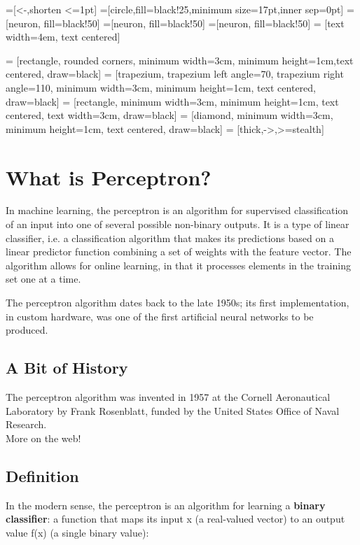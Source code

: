 \documentclass[12pt, right open]{memoir}
\begin{document}

=[<-,shorten <=1pt]
=[circle,fill=black!25,minimum size=17pt,inner sep=0pt]
=[neuron, fill=black!50]
=[neuron, fill=black!50]
=[neuron, fill=black!50]
 = [text width=4em, text centered]

 = [rectangle, rounded corners, minimum width=3cm, minimum height=1cm,text centered, draw=black]
 = [trapezium, trapezium left angle=70, trapezium right angle=110, minimum width=3cm, minimum height=1cm, text centered, draw=black]
 = [rectangle, minimum width=3cm, minimum height=1cm, text centered, text width=3cm, draw=black]
 = [diamond, minimum width=3cm, minimum height=1cm, text centered, draw=black]
 = [thick,->,>=stealth]

\chapter{What is Perceptron?}
In machine learning, the perceptron is an algorithm for supervised classification of an input into one of several possible non-binary outputs. It is a type of linear classifier, i.e. a classification algorithm that makes its predictions based on a linear predictor function combining a set of weights with the feature vector. The algorithm allows for online learning, in that it processes elements in the training set one at a time.

The perceptron algorithm dates back to the late 1950s; its first implementation, in custom hardware, was one of the first artificial neural networks to be produced.

\section{A Bit of History}
The perceptron algorithm was invented in 1957 at the Cornell Aeronautical Laboratory by Frank Rosenblatt, funded by the United States Office of Naval Research. \hfill \\

More on the web!

\section{Definition}
In the modern sense, the perceptron is an algorithm for learning a \textbf{binary classifier}: a function that maps its input x (a real-valued vector) to an output value f(x) (a single binary value):
\end{document}
